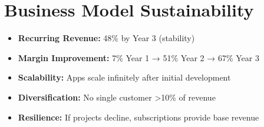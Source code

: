 \section{Business Model Sustainability}

\begin{itemize}
    \item \textbf{Recurring Revenue:} 48\% by Year 3 (stability)
    \item \textbf{Margin Improvement:} 7\% Year 1 → 51\% Year 2 → 67\% Year 3
    \item \textbf{Scalability:} Apps scale infinitely after initial development
    \item \textbf{Diversification:} No single customer >10\% of revenue
    \item \textbf{Resilience:} If projects decline, subscriptions provide base revenue
\end{itemize}

